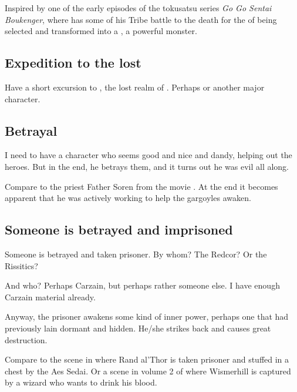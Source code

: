 Inspired by one of the early episodes of the tokusatsu series \emph{Go Go Sentai Boukenger}, where \Ryuuoun{} has some of his \Jaryuu{} Tribe battle to the death for the \honour of being selected and transformed into a \Daijakuryuu, a powerful monster.







\subsection{Expedition to the lost \Dragonland}
Have a short excursion to \Dragonland, the lost realm of \dragons. Perhaps \Nzessuacrith{} or another major \draconian{} character. 







\subsection{Betrayal}
I need to have a character who seems good and nice and dandy, helping out the heroes. But in the end, he betrays them, and it turns out he was evil all along. 

Compare to the priest Father Soren from the movie \cite{Movie:GargoylesRevenge}. 
At the end it becomes apparent that he was actively working to help the gargoyles awaken. 







\subsection{Someone is betrayed and imprisoned}
Someone is betrayed and taken prisoner. By whom? The Redcor? Or the Rissitics?

And who? Perhaps Carzain, but perhaps rather someone else. I have enough Carzain material already. 

Anyway, the prisoner awakens some kind of inner power, perhaps one that had previously lain dormant and hidden. He/she strikes back and causes great destruction. 

Compare to the scene in  where Rand al'Thor is taken prisoner and stuffed in a chest by the Aes Sedai. Or a scene in volume 2 of \FLuneNoire{} where Wismerhill is captured by a wizard who wants to drink his blood. 







